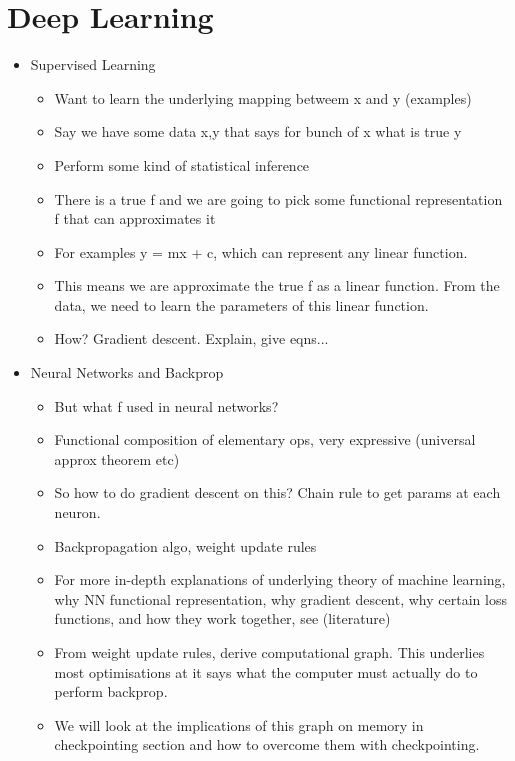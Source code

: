 \section{Deep Learning}
\begin{itemize}
    \item Supervised Learning
    \begin{itemize}
        \item Want to learn the underlying mapping betweem x and y (examples)
        \item Say we have some data x,y that says for bunch of x what is true y
        \item Perform some kind of statistical inference
        \item There is a true f and we are going to pick some functional representation f that can approximates it
        \item For examples y = mx + c, which can represent any linear function. 
        \item This means we are approximate the true f as a linear function. From the data, we need to learn the parameters of this linear function.
        \item How? Gradient descent. Explain, give eqns...
    \end{itemize}
    \item Neural Networks and Backprop
    \begin{itemize}
        \item But what f used in neural networks?
        \item Functional composition of elementary ops, very expressive (universal approx theorem etc)
        \item So how to do gradient descent on this? Chain rule to get params at each neuron.
        \item Backpropagation algo, weight update rules
        \item For more in-depth explanations of underlying theory of machine learning, why NN functional representation, why gradient descent, why certain loss functions, and how they work together, see (literature)
        \item From weight update rules, derive computational graph. This underlies most optimisations at it says what the computer must actually do to perform backprop.
        \item We will look at the implications of this graph on memory in checkpointing section and how to overcome them with checkpointing.
    \end{itemize}
\end{itemize}

